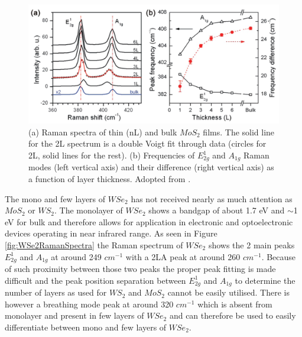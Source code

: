 \begin{figure}[h]
	\begin{center}
		\includegraphics[scale=0.3]{NumberLayerIdentificationRamanMoS2.png}
		\caption{(a) Raman spectra of thin (nL) and bulk $MoS_2$ films. The solid line for the 2L spectrum is a double Voigt fit through data (circles for 2L, solid lines for the rest). (b) Frequencies of $E^1_{2g}$ and $A_{1g}$ Raman modes (left vertical axis) and their difference (right vertical axis) as a function of layer thickness. Adopted from \cite{Lee2010}.}
		\label{fig:NumberLayerIdentificationRamanMoS2}
	\end{center}
\end{figure}

The mono and few layers of $WSe_2$ has not received nearly as much attention as $MoS_2$ or $WS_2$. The monolayer of $WSe_2$ shows a bandgap of about 1.7 eV \cite{Yun2012} and $\sim$1 eV for bulk and therefore allows for application in electronic and optoelectronic devices operating in near infrared range. As seen in Figure \ref{fig:WSe2RamanSpectra} the Raman spectrum of $WSe_2$ shows the 2 main peaks $E^1_{2g}$ and $A_{1g}$ at around 249 $cm^{-1}$ with a 2LA peak at around 260 $cm^{-1}$. Because of such proximity between those two peaks the proper peak fitting is made difficult and the peak position separation between $E^1_{2g}$ and $A_{1g}$ to determine the number of layers as used for $WS_2$ and $MoS_2$ cannot be easily utilised. There is however a breathing mode peak at around 320 $cm^{-1}$ which is absent from monolayer and present in few layers of $WSe_2$ and can therefore be used to easily differentiate between mono and few layers of $WSe_2$. 

